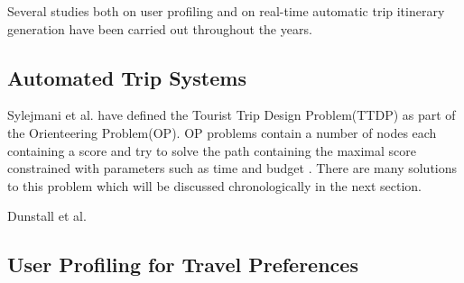 Several studies both on user profiling and on real-time automatic trip
itinerary generation have been carried out throughout the years. 

\subsection{Automated Trip Systems}

Sylejmani et al.\cite{Sylejmani2017} have defined the Tourist Trip
Design Problem(TTDP) as part of the Orienteering Problem(OP). OP
problems contain a number of nodes each containing a score and try to
solve the path containing the maximal score constrained with
parameters such as time and budget \cite{Gunawan2016}. There are many solutions to this
problem which will be discussed chronologically in the next section.

Dunstall et al. \cite{DUNSTALL2008a}


\subsection{User Profiling for Travel Preferences}
